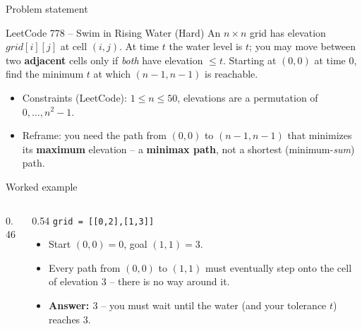 \documentclass[11pt,aspectratio=169]{beamer}
\begin{document}
\begin{frame}{Problem statement}
  \begin{block}{LeetCode 778 -- Swim in Rising Water (\textcolor{red!60!black}{Hard})}
    An $n\times n$ grid has elevation $grid[i][j]$ at cell $(i,j)$. At time $t$
    the water level is $t$; you may move between two \textbf{adjacent} cells
    only if \emph{both} have elevation $\le t$. Starting at $(0,0)$ at time $0$,
    find the minimum $t$ at which $(n-1,n-1)$ is reachable.
  \end{block}
  \begin{itemize}
    \item Constraints (LeetCode): $1 \le n \le 50$, elevations are a permutation
    of $0,\dots,n^2-1$.
    \item Reframe: you need the path from $(0,0)$ to $(n{-}1,n{-}1)$ that
    minimizes its \textbf{maximum} elevation -- a \textbf{minimax path}, not a
    shortest (minimum-\emph{sum}) path.
  \end{itemize}
\end{frame}

\begin{frame}{Worked example}
  \begin{columns}
  \begin{column}{0.46\textwidth}
  \begin{center}
  \end{center}
  \end{column}
  \begin{column}{0.54\textwidth}
  \scriptsize
  \texttt{grid = [[0,2],[1,3]]}
  \begin{itemize}
    \item Start $(0,0){=}0$, goal $(1,1){=}3$.
    \item Every path from $(0,0)$ to $(1,1)$ must eventually step onto the cell
    of elevation $3$ -- there is no way around it.
    \item \textbf{Answer: $3$} -- you must wait until the water (and your
    tolerance $t$) reaches $3$.
  \end{itemize}
  \end{column}
  \end{columns}
\end{frame}
\end{document}
